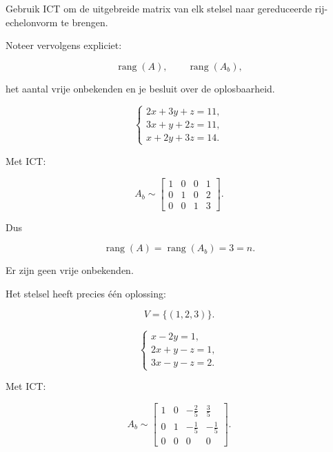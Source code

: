 \documentclass{ximera}
\begin{document}
\begin{oefening}{\oefB\ESS}

Gebruik ICT om de uitgebreide matrix van elk stelsel naar gereduceerde
rij-echelonvorm te brengen.

Noteer vervolgens expliciet:

\[
\operatorname{rang}(A),\qquad
\operatorname{rang}(A_b),
\]

het aantal vrije onbekenden en je besluit over de oplosbaarheid.


\begin{question}

\[
\begin{cases}
2x+3y+z=11,\\
3x+y+2z=11,\\
x+2y+3z=14.
\end{cases}
\]

\begin{oplossing}

Met ICT:

\[
A_b
\sim
\left[
\begin{array}{ccc|c}
1&0&0&1\\
0&1&0&2\\
0&0&1&3
\end{array}
\right].
\]

Dus

\[
\operatorname{rang}(A)
=
\operatorname{rang}(A_b)
=
3=n.
\]

Er zijn geen vrije onbekenden.

Het stelsel heeft precies één oplossing:

\[
V=\{(1,2,3)\}.
\]

\end{oplossing}

\end{question}


\begin{question}

\[
\begin{cases}
x-2y=1,\\
2x+y-z=1,\\
3x-y-z=2.
\end{cases}
\]

\begin{oplossing}

Met ICT:

\[
A_b
\sim
\left[
\begin{array}{ccc|c}
1&0&-\frac25&\frac35\\
0&1&-\frac15&-\frac15\\
0&0&0&0
\end{array}
\right].
\]


\end{oplossing}
\end{question}
\end{oefening}
\end{document}
